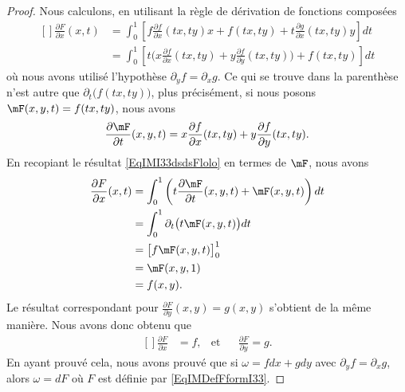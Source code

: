 \begin{proof}
Nous calculons, en utilisant la règle de dérivation de fonctions composées
\begin{equation}		\label{EqIMI33dsdsFlolo}
	\begin{aligned}[]
		\frac{ \partial F }{ \partial x }(x,t)	&=\int_0^1\left[   f\frac{ \partial f }{ \partial x }(tx,ty)x+f(tx,ty)+t\frac{ \partial g }{ \partial x }(tx,ty)y  \right]dt\\
		&=\int_0^1\left[ t\Big( x\frac{ \partial f }{ \partial x }(tx,ty)+y\frac{ \partial f }{ \partial y }(tx,ty) \Big)+f(tx,ty) \right]dt
	\end{aligned}
\end{equation}
où nous avons utilisé l'hypothèse $\partial_yf=\partial_xg$. Ce qui se trouve dans la parenthèse n'est autre que $\partial_t\big( f(tx,ty) \big)$, plus précisément, si nous posons $\mF(x,y,t)=f(tx,ty)$, nous avons
\begin{equation}
	\frac{ \partial \mF }{ \partial t }(x,y,t)= x\frac{ \partial f }{ \partial x }(tx,ty)+y\frac{ \partial f }{ \partial y }(tx,ty).
\end{equation}
En recopiant le résultat \eqref{EqIMI33dsdsFlolo} en termes de $\mF$, nous avons
\begin{equation}
	\begin{aligned}[]
		\frac{ \partial F }{ \partial x }(x,t)	&=\int_0^1\left( t\frac{ \partial \mF }{ \partial t }(x,y,t)+\mF(x,y,t) \right)dt\\
		&=\int_0^1\partial_t\big( t\mF(x,y,t) \big)dt\\
		&=\big[ f\mF(x,y,t) \big]_0^1\\
		&=\mF(x,y,1)\\
		&=f(x,y).
	\end{aligned}
\end{equation}
Le résultat correspondant pour $\frac{ \partial F }{ \partial y }(x,y)=g(x,y)$ s'obtient de la même manière. Nous avons donc obtenu que
\begin{equation}		\label{EqIMFormI33Fffdd}
	\begin{aligned}[]
		\frac{ \partial F }{ \partial x }&=f,  &\text{et}&& \frac{ \partial F }{ \partial y }=g.
	\end{aligned}
\end{equation}
En ayant prouvé cela, nous avons prouvé que si $\omega=fdx+gdy$ avec $\partial_yf=\partial_xg$, alors $\omega=dF$ où $F$ est définie par \eqref{EqIMDefFformI33}.
\end{proof}

